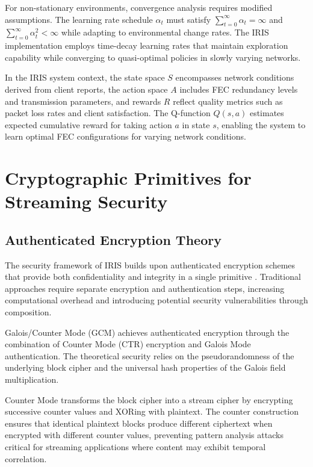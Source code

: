 For non-stationary environments, convergence analysis requires modified assumptions. The learning rate schedule $\alpha_t$ must satisfy $\sum_{t=0}^{\infty} \alpha_t = \infty$ and $\sum_{t=0}^{\infty} \alpha_t^2 < \infty$ while adapting to environmental change rates. The IRIS implementation employs time-decay learning rates that maintain exploration capability while converging to quasi-optimal policies in slowly varying networks.

In the IRIS system context, the state space $S$ encompasses network conditions derived from client reports, the action space $A$ includes FEC redundancy levels and transmission parameters, and rewards $R$ reflect quality metrics such as packet loss rates and client satisfaction. The Q-function $Q(s,a)$ estimates expected cumulative reward for taking action $a$ in state $s$, enabling the system to learn optimal FEC configurations for varying network conditions.

\section{Cryptographic Primitives for Streaming Security}

\subsection{Authenticated Encryption Theory}

The security framework of IRIS builds upon authenticated encryption schemes that provide both confidentiality and integrity in a single primitive \cite{dworkin2007recommendation}. Traditional approaches require separate encryption and authentication steps, increasing computational overhead and introducing potential security vulnerabilities through composition.

Galois/Counter Mode (GCM) achieves authenticated encryption through the combination of Counter Mode (CTR) encryption and Galois Mode authentication. The theoretical security relies on the pseudorandomness of the underlying block cipher and the universal hash properties of the Galois field multiplication.

Counter Mode transforms the block cipher into a stream cipher by encrypting successive counter values and XORing with plaintext. The counter construction ensures that identical plaintext blocks produce different ciphertext when encrypted with different counter values, preventing pattern analysis attacks critical for streaming applications where content may exhibit temporal correlation.

